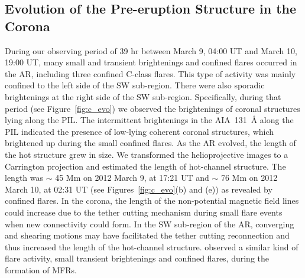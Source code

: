 \documentclass{aastex62}
\begin{document}
\subsection{\textbf{Evolution of the Pre-eruption Structure in the Corona}}
During our observing period of 39 hr between March 9, 04:00 UT and March 10,  19:00 UT, many small and transient brightenings and confined flares occurred in the AR, including three confined C-class flares. This type of activity was mainly confined to the left side of the SW sub-region. There were also sporadic brightenings at the right side of the SW sub-region. Specifically, during that period (see Figure~\ref{fig:c_evo}) we observed the brightenings of coronal structures lying along the PIL. The intermittent brightenings in the AIA~131~\AA{} along the PIL indicated the presence of low-lying coherent coronal structures, which brightened up during the small confined flares. As the AR evolved, the length of the hot structure grew in size. We transformed the helioprojective images to a Carrington projection and estimated the length of hot-channel structure. The length was $\sim$ 45 Mm on 2012 March 9, at 17:21 UT and $\sim$ 76 Mm on 2012 March 10, at 02:31 UT (see Figures~\ref{fig:c_evo}(b) and (e)) as revealed by confined flares. In the corona, the length of the non-potential magnetic field lines could increase due to the tether cutting mechanism during small flare events when new connectivity could form. In the SW sub-region of the AR, converging and shearing motions may have facilitated the tether cutting reconnection and thus increased the length of the hot-channel structure. \citet{Chintzoglou_etal_2015} observed a similar kind of flare activity, small transient brightenings and confined flares, during the formation of MFRs.
\end{document}
